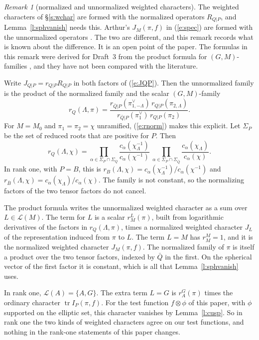 \documentclass[12pt,letterpaper]{article}
\numberwithin{equation}{section}
\theoremstyle{plain}
\theoremstyle{definition}
\theoremstyle{remark}
\newtheorem{remark}[theorem]{Remark}
\newcommand{\cL}{\mathcal{L}}
\DeclareMathOperator{\tr}{tr}
\begin{document}
\begin{remark}[normalized and unnormalized weighted characters]\label{r:norm}
The weighted characters of \S\ref{s:wchar} are formed with the normalized operators $R_{Q|P}$, and Lemma~\ref{l:sphvanish} needs this. Arthur's $J_M(\pi,f)$ in (\ref{e:spec}) are formed with the unnormalized operators \cite[\S12, Remark~1]{Ar91}. The two are different, and this remark records what is known about the difference. It is an open point of the paper. The formulas in this remark were derived for Draft~3 from the product formula for $(G,M)$-families \cite[Lemma~6.3]{Ar81}, and they have not been compared with the literature.

Write $J_{Q|P}=r_{Q|P}R_{Q|P}$ in both factors of (\ref{e:JQP}). Then the unnormalized family is the product of the normalized family and the scalar $(G,M)$-family
\[
r_Q(\Lambda,\pi)=\frac{r_{\bar Q|P}(\pi^\vee_{1,-\Lambda})\,r_{Q|P}(\pi_{2,\Lambda})}{r_{\bar Q|P}(\pi^\vee_1)\,r_{Q|P}(\pi_2)}.
\]
For $M=M_0$ and $\pi_1=\pi_2=\chi$ unramified, (\ref{e:rnorm}) makes this explicit. Let $\Sigma_P$ be the set of reduced roots that are positive for $P$. Then
\begin{equation}\label{e:rQ}
r_Q(\Lambda,\chi)=\prod_{\alpha\in\Sigma_P\cap\Sigma_Q}\frac{c_\alpha(\chi_\Lambda^{-1})}{c_\alpha(\chi^{-1})}\ \prod_{\alpha\in\Sigma_P\cap\Sigma_{\bar Q}}\frac{c_\alpha(\chi_\Lambda)}{c_\alpha(\chi)}.
\end{equation}
In rank one, with $P=B$, this is $r_B(\Lambda,\chi)=c_\alpha(\chi_\Lambda^{-1})/c_\alpha(\chi^{-1})$ and $r_{\bar B}(\Lambda,\chi)=c_\alpha(\chi_\Lambda)/c_\alpha(\chi)$. The family is not constant, so the normalizing factors of the two tensor factors do not cancel.

The product formula writes the unnormalized weighted character as a sum over $L\in\cL(M)$. The term for $L$ is a scalar $r_M^L(\pi)$, built from logarithmic derivatives of the factors in $r_Q(\Lambda,\pi)$, times a normalized weighted character $J_L$ of the representation induced from $\pi$ to $L$. The term $L=M$ has $r_M^M=1$, and it is the normalized weighted character $J_M(\pi,f)$. The normalized family of $\pi$ is itself a product over the two tensor factors, indexed by $\bar Q$ in the first. On the spherical vector of the first factor it is constant, which is all that Lemma~\ref{l:sphvanish} uses.

In rank one, $\cL(A)=\{A,G\}$. The extra term $L=G$ is $r_A^G(\pi)$ times the ordinary character $\tr I_P(\pi,f)$. For the test function $f\otimes\phi$ of this paper, with $\phi$ supported on the elliptic set, this character vanishes by Lemma~\ref{l:cusp}. So in rank one the two kinds of weighted characters agree on our test functions, and nothing in the rank-one statements of this paper changes.


\end{remark}
\end{document}
